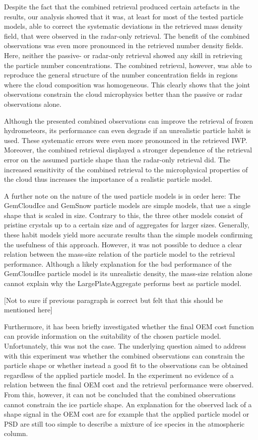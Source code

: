 \documentclass[journal abbreviation, manuscript]{copernicus}
\begin{document}
Despite the fact that the combined retrieval produced certain artefacts in the
results, our analysis showed that it was, at least for most of the tested
particle models, able to correct the systematic deviations in the retrieved mass
density field, that were observed in the radar-only retrieval. The benefit of
the combined observations was even more pronounced in the retrieved number
density fields. Here, neither the passive- or radar-only retrieval showed any
skill in retrieving the particle number concentrations. The combined retrieval,
however, was able to reproduce the general structure of the number concentration
fields in regions where the cloud composition was homogeneous. This clearly
shows that the joint observations constrain the cloud microphysics better than
the passive or radar observations alone.

Although the presented combined observations can improve the retrieval of frozen
hydrometeors, its performance can even degrade if an unrealistic particle habit
is used. These systematic errors were even more pronounced in the retrieved IWP.
Moreover, the combined retrieval displayed a stronger dependence of the
retrieval error on the assumed particle shape than the radar-only retrieval did.
The increased sensitivity of the combined retrieval to the microphysical
properties of the cloud thus increases the importance of a realistic particle
model.

A further note on the nature of the used particle models is in order here: The
GemCloudIce and GemSnow particle models are simple models, that use a single
shape that is scaled in size. Contrary to this, the three other models consist
of pristine crystals up to a certain size and of aggregates for larger sizes.
Generally, these habit models yield more accurate results than the simple models
confirming the usefulness of this approach. However, it was not possible to
deduce a clear relation between the mass-size relation of the particle model to
the retrieval performance. Although a likely explanation for the bad performance
of the GemCloudIce particle model is its unrealistic density, the mass-size
relation alone cannot explain why the LargePlateAggregate performs best as
particle model.

[Not to sure if previous paragraph is correct but felt that this should be mentioned
  here]

Furthermore, it has been briefly investigated whether the final OEM cost
function can provide information on the suitability of the chosen particle
model. Unfortunately, this was not the case. The underlying question aimed to
address with this experiment was whether the combined observations can constrain
the particle shape or whether instead a good fit to the observations can be
obtained regardless of the applied particle model. In the experiment no evidence
of a relation between the final OEM cost and the retrieval performance were
observed. From this, however, it can not be concluded that the combined
observations cannot constrain the ice particle shape. An explanation for the
observed lack of a shape signal in the OEM cost are for example that the applied
particle model or PSD are still too simple to describe a mixture of ice species
in the atmospheric column.
\end{document}
